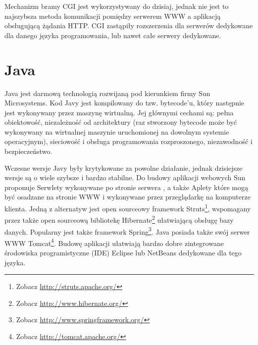 \documentclass[a4paper,12pt,oneside]{report}
\begin{document}
Mechanizm bramy CGI jest wykorzystywany do dzisiaj, jednak nie jest to najszybsza metoda komunikacji pomiędzy serwerem WWW a aplikacją obsługującą żądania HTTP. CGI zastąpiły rozszerzenia dla serwerów dedykowane dla danego języka programowania, lub nawet całe serwery dedykowane.

\section{Java}
\label{sec:java}
Java jest darmową technologią rozwijaną pod kierunkiem firmy Sun Microsystems. Kod Javy jest kompilowany do tzw. bytecode’u, który następnie jest wykonywany przez maszynę wirtualną. Jej głównymi cechami są: pełna obiektowość,  niezależność od architektury (raz stworzony bytecode może być wykonywany na wirtualnej maszynie uruchomionej na dowolnym systemie operacyjnym), sieciowość i obsługa programowania rozproszonego, niezawodność i bezpieczeństwo.

Wczesne wersje Javy były krytykowane za powolne działanie, jednak dzisiejsze wersje są o wiele szybsze i bardzo stabilne. Do budowy aplikacji webowych Sun proponuje Serwlety wykonywane po stronie serwera , a także Aplety które mogą być osadzane na stronie WWW i wykonywane przez przeglądarkę na komputerze klienta. Jedną z alternatyw jest open sourceowy framework Struts\footnote{Zobacz \url{http://struts.apache.org/}}, wspomagany przez także open sourceową bibliotekę Hibernate\footnote{Zobacz \url{http://www.hibernate.org/}} ułatwiającą obsługę bazy danych. Popularny jest także framework Spring\footnote{Zobacz \url{http://www.springframework.org/}}. Java posiada także swój serwer WWW Tomcat\footnote{Zobacz \url{http://tomcat.apache.org/}}. Budowę aplikacji ułatwiają bardzo dobre zintegrowane środowiska programistyczne (IDE) Eclipse lub NetBeans dedykowane dla tego języka.
\end{document}
